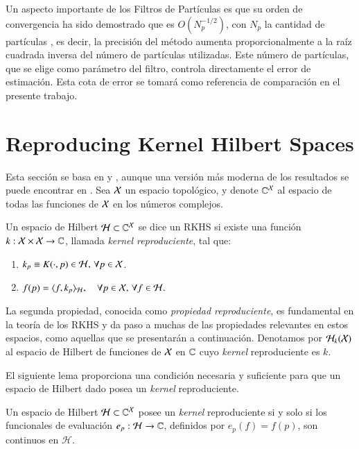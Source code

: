 Un aspecto importante de los Filtros de Partículas es que su orden de convergencia ha sido demostrado que es $O(N_p^{-1/2})$, con $N_p$ la cantidad de partículas \cite{Crisan2002APractitioners, Chopin2020AnCarlo}, es decir, la precisión del método aumenta proporcionalmente a la raíz cuadrada inversa del número de partículas utilizadas. Este número de partículas, que se elige como parámetro del filtro, controla directamente el error de estimación. Esta cota de error se tomará como referencia de comparación en el presente trabajo.

\section{Reproducing Kernel Hilbert Spaces}
Esta sección se basa en \cite{Wendland2004ScatteredApproximation} y \cite{Berlinet2004ReproducingStatistics}, aunque una versión más moderna de los resultados se puede encontrar en \cite{Saitoh2016TheoryApplications}. Sea \( \mathcal{X} \) un espacio topológico, y denote \(\mathbb{C}^{\mathcal{X}}\) al espacio de todas las funciones de \( \mathcal{X} \) en los números complejos. 

\begin{defn}  
Un espacio de Hilbert \( \mathcal{H} \subset \mathbb{C}^{\mathcal{X}} \) se dice un RKHS si existe una función \( k: \mathcal{X} \times \mathcal{X} \to \mathbb{C} \), llamada \textit{kernel reproduciente}, tal que:
\begin{enumerate}
    \item \( k_p \equiv K(\cdot, p) \in \mathcal{H}, \, \forall p \in \mathcal{X} \).
    \item \( f(p) = \langle f, k_p \rangle_{\mathcal{H}}, \quad \forall p \in \mathcal{X}, \, \forall f \in \mathcal{H}. \)
\end{enumerate}
\end{defn}

\noindent La segunda propiedad, conocida como \textit{propiedad reproduciente}, es fundamental en la teoría de los RKHS y da paso a muchas de las propiedades relevantes en estos espacios, como aquellas que se presentarán a continuación. Denotamos por \( \mathcal{H}_k(\mathcal{X}) \) al espacio de Hilbert de funciones de \( \mathcal{X} \) en \( \mathbb{C} \) cuyo \textit{kernel} reproduciente es \( k \).

El siguiente lema proporciona una condición necesaria y suficiente para que un espacio de Hilbert dado posea un \textit{kernel} reproduciente.

\begin{lema}
Un espacio de Hilbert \( \mathcal{H} \subset \mathbb{C}^{\mathcal{X}} \) posee un \textit{kernel} reproduciente si y solo si los funcionales de evaluación \( e_p: \mathcal{H} \to \mathbb{C} \), definidos por \( e_p(f) = f(p) \), son continuos en \( \mathcal{H} \).
\end{lema}

